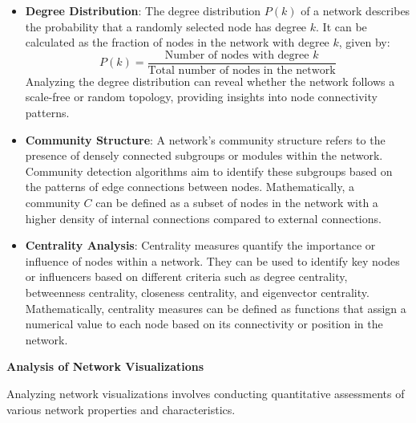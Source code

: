 \documentclass[12pt]{book} %
\begin{document}
\begin{itemize}
    \item \textbf{Degree Distribution}: The degree distribution \(P(k)\) of a network describes the probability that a randomly selected node has degree \(k\). It can be calculated as the fraction of nodes in the network with degree \(k\), given by:
    \[ P(k) = \frac{{\text{{Number of nodes with degree }} k}}{{\text{{Total number of nodes in the network}}}} \]
    Analyzing the degree distribution can reveal whether the network follows a scale-free or random topology, providing insights into node connectivity patterns.
    
    \item \textbf{Community Structure}: A network's community structure refers to the presence of densely connected subgroups or modules within the network. Community detection algorithms aim to identify these subgroups based on the patterns of edge connections between nodes. Mathematically, a community \(C\) can be defined as a subset of nodes in the network with a higher density of internal connections compared to external connections.
    
    \item \textbf{Centrality Analysis}: Centrality measures quantify the importance or influence of nodes within a network. They can be used to identify key nodes or influencers based on different criteria such as degree centrality, betweenness centrality, closeness centrality, and eigenvector centrality. Mathematically, centrality measures can be defined as functions that assign a numerical value to each node based on its connectivity or position in the network.
\end{itemize}

\textbf{Analysis of Network Visualizations}

Analyzing network visualizations involves conducting quantitative assessments of various network properties and characteristics.
\end{document}
